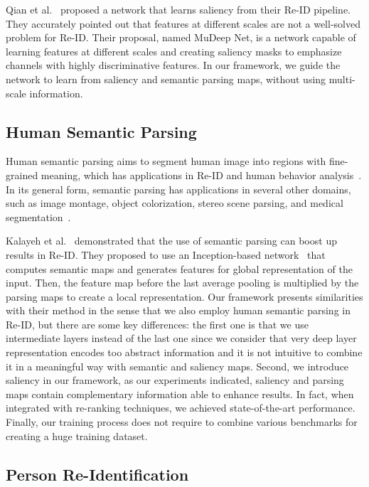 \documentclass[final,3p,times,twocolumn]{elsarticle}
\begin{document}
Qian et al.~\cite{qian2017multi} proposed a network that learns saliency from their Re-ID pipeline. They accurately pointed out that features at different scales are not a well-solved problem for Re-ID. Their proposal, named MuDeep Net, is a network capable of learning features at different scales and creating saliency masks to emphasize channels with highly discriminative features. In our framework, we guide the network to learn from saliency and semantic parsing maps, without using multi-scale information.

\subsection{Human Semantic Parsing}

Human semantic parsing aims to segment human image into regions with fine-grained meaning, which has applications in Re-ID and human behavior analysis~\cite{Gong_2017_CVPR}. In its general form, semantic parsing has applications in several other domains, such as image montage, object colorization, stereo scene parsing, and medical segmentation~\cite{liu2015survey}.

Kalayeh et al.~\cite{kalayeh2018human} demonstrated that the use of semantic parsing can boost up results in Re-ID. They proposed to use an Inception-based network~\cite{szegedy2015going} that computes semantic maps and generates features for global representation of the input. Then, the feature map before the last average pooling is multiplied by the parsing maps to create a local representation. Our framework presents similarities with their method in the sense that we also employ human semantic parsing in Re-ID, but there are some key differences: the first one is that we use intermediate layers instead of the last one since we consider that very deep layer representation encodes too abstract information and it is not intuitive to combine it in a meaningful way with semantic and saliency maps. Second, we introduce saliency in our framework, as our experiments indicated, saliency and parsing maps contain complementary information able to enhance results. In fact, when integrated with re-ranking techniques, we achieved state-of-the-art performance. Finally, our training process does not require to combine various benchmarks for creating a huge training dataset.

\subsection{Person Re-Identification}
\end{document}
